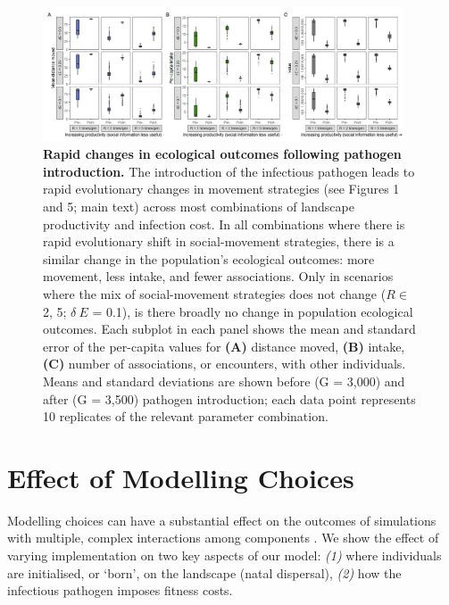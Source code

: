 \begin{figure}
    \centering
    \includegraphics[width=0.95\textwidth]{figures/pathomove/fig_eco_compare_default.png}
    \caption{
        \textbf{Rapid changes in ecological outcomes following pathogen introduction.} 
        The introduction of the infectious pathogen leads to rapid evolutionary changes in movement strategies (see Figures 1 and 5; main text) across most combinations of landscape productivity and infection cost. 
        In all combinations where there is rapid evolutionary shift in social-movement strategies, there is a similar change in the population's ecological outcomes: more movement, less intake, and fewer associations. 
        Only in scenarios where the mix of social-movement strategies does not change (\(R \in\) 2, 5; $\delta~E$ = 0.1), is there broadly no change in population ecological outcomes. 
        Each subplot in each panel shows the mean and standard error of the per-capita values for \textbf{(A)} distance moved, \textbf{(B)} intake, \textbf{(C)} number of associations, or encounters, with other individuals. 
        Means and standard deviations are shown before (G = 3,000) and after (G = 3,500) pathogen introduction; each data point represents 10 replicates of the relevant parameter combination.
    }\label{fig:patho_eco_compare}
\end{figure}

\section*{Effect of Modelling Choices}

Modelling choices can have a substantial effect on the outcomes of simulations with multiple, complex interactions among components \parencite{scherer2020,gupte2021a,netz2021}.
We show the effect of varying implementation on two key aspects of our model: \textit{(1)} where individuals are initialised, or `born', on the landscape (natal dispersal), \textit{(2)} how the infectious pathogen imposes fitness costs.

